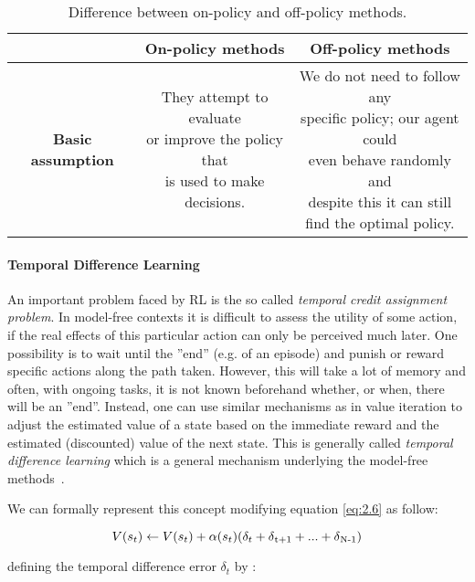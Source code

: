 \begin{table}
\centering
\begin{tabular}{|c|c|c|}
	\hline 
	&\textbf{On-policy methods}  &\textbf{Off-policy methods}  \\ 
	\hline \textbf{Basic assumption}
	& \thead{They attempt to evaluate\\ or improve the policy that\\ is used to make decisions.}  &\thead{We do not need to follow any \\ specific policy; our agent could \\ even behave randomly and \\ despite this it can still  \\ find the optimal policy. }  \\ 
	\hline 
\end{tabular}
\caption{Difference between on-policy and off-policy methods.}
\end{table} 

\paragraph{Temporal Difference Learning} An important problem faced by RL is the so called \textit{temporal credit assignment problem}. In model-free contexts it is difficult to assess the utility of some action, if the real effects of this particular action can only be perceived much later. One possibility is to wait until the ”end” (e.g. of an episode) and punish or reward specific actions along the path taken. However, this will take a lot of memory and often, with ongoing tasks, it is not known beforehand whether, or when, there will be an ”end”. Instead, one can use similar mechanisms as in value iteration to adjust the estimated value of a state based on the immediate reward and the estimated (discounted) value of the next state. This is generally called \textit{temporal difference learning} which is a general mechanism underlying the model-free methods~\cite{wiering2012reinforcement}. 

We can formally represent this concept modifying equation \ref{eq:2.6} as follow:

\begin{equation}
V(s_t) \leftarrow V(s_t) + \alpha(s_t)(\delta_t + \delta\textsubscript{t+1} + ... + \delta\textsubscript{N-1}) 
\end{equation}

defining the temporal difference error $\delta_t$ by :

